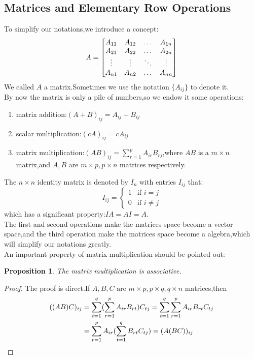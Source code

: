 \documentclass{article}
\begin{document}
\subsection{Matrices and Elementary Row Operations}
\noindent To simplify our notations,we introduce a concept:
\[A=\begin{bmatrix}
	A_{11}&A_{12}&$\ldots$&A_{1n}\\
	A_{21}&A_{22}&$\ldots$&A_{2n}\\
	\vdots&\vdots&\ddots&\vdots\\
	A_{n1}&A_{n2}&$\ldots$&A_{nn}
\end{bmatrix}\]
We called $A$ a matrix.Sometimes we use the notation $\{A_{ij}\}$ to denote it.\\
\indent By now the matrix is only a pile of numbers,so we endow it some operations:
\begin{enumerate}
	\item matrix addition:$(A+B)_{ij}=A_{ij}+B_{ij}$
	\item scalar multiplication:$(cA)_{ij}=cA_{ij}$
	\item matrix multiplication:$(AB)_{ij}=\sum\limits_{r=1}^pA_{ir}B_{rj}$,where $AB$ is a $m\times n$ matrix,and $A,B$ are $m\times p,p\times n$ matrices respectively. 
\end{enumerate}
The $n\times n$ identity matrix is denoted by $I_n$ with entries $I_{ij}$ that:
\[I_{ij}=
\begin{cases}
	1&\text{if }i=j\\
	0&\text{if }i\neq j
\end{cases}\]
which has a significant property:$IA=AI=A$.\\
\indent The first and second operations make the matrices space become a vector space,and the third operation make the matrices space become a algebra,which will simplify our notations greatly.\\
\indent An important property of matrix multiplication should be pointed out:
\theoremstyle{plain}\newtheorem{pro}{Proposition}[section]
\begin{pro}
	The matrix multiplication is associative.
\end{pro}
\begin{proof}
	The proof is direct.If $A,B,C$ are $m\times p,p\times q,q\times n$ matrices,then
	\begin{align}
		((AB)C)_{ij}&=\sum\limits_{t=1}^q(\sum\limits_{r=1}^pA_{ir}B_{rt})C_{tj}=\sum\limits_{t=1}^q\sum\limits_{r=1}^pA_{ir}B_{rt}C_{tj}\notag\\
		&=\sum\limits_{r=1}^pA_{ir}(\sum\limits_{t=1}^qB_{rt}C_{tj})=(A(BC))_{ij}\notag
	\end{align}
\end{proof}
\end{document}
